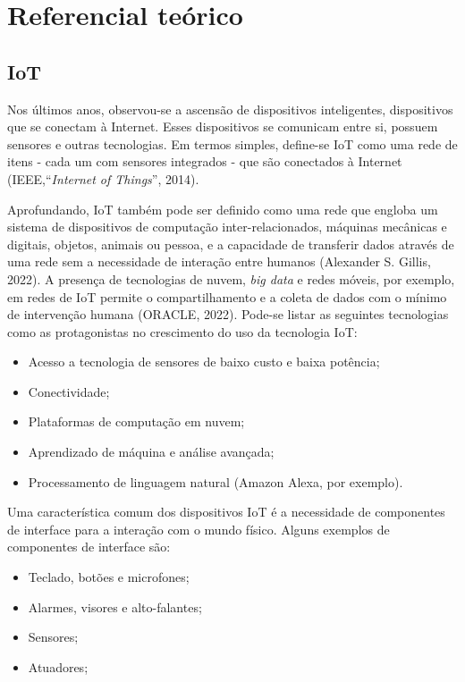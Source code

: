 \chapter{Referencial teórico}\label{chapter:referencial_teorico}

\section{IoT}

Nos últimos anos, observou-se a ascensão de dispositivos inteligentes, dispositivos que se conectam à Internet. Esses dispositivos se comunicam entre si, possuem sensores e outras tecnologias. Em termos simples, define-se IoT como uma rede de itens - cada um com sensores integrados - que são conectados à Internet (IEEE,``\textit{Internet of Things}'', 2014).

Aprofundando, IoT também pode ser definido como uma rede que engloba um sistema de dispositivos de computação inter-relacionados, máquinas mecânicas e digitais, objetos, animais ou pessoa, e a capacidade de transferir dados através de uma rede sem a necessidade de interação entre humanos (Alexander S. Gillis, 2022). A presença de tecnologias de nuvem, \textit{big data} e redes móveis, por exemplo, em redes de IoT permite o compartilhamento e a coleta de dados com o mínimo de intervenção humana (ORACLE, 2022). Pode-se listar as seguintes tecnologias como as protagonistas no crescimento do uso da tecnologia IoT:

\begin{itemize}
	\item Acesso a tecnologia de sensores de baixo custo e baixa potência;
	\item Conectividade;
	\item Plataformas de computação em nuvem;
	\item Aprendizado de máquina e análise avançada;
	\item Processamento de linguagem natural (Amazon Alexa, por exemplo).
\end{itemize}

Uma característica comum dos dispositivos IoT é a necessidade de componentes de interface para a interação com o mundo físico. Alguns exemplos de componentes de interface são:

\begin{itemize}
	\item Teclado, botões e microfones;
	\item Alarmes, visores e alto-falantes;
	\item Sensores;
	\item Atuadores;
\end{itemize}

